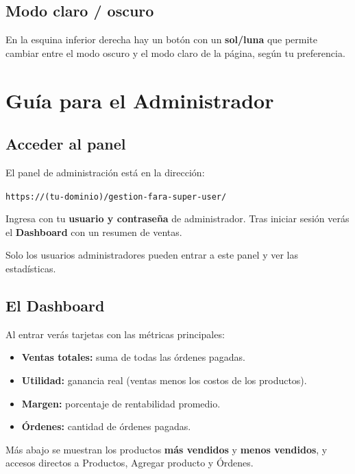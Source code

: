 \documentclass[11pt,a4paper]{article}
\begin{document}
\subsection{Modo claro / oscuro}

En la esquina inferior derecha hay un botón con un \textbf{sol/luna} que permite cambiar
entre el modo oscuro y el modo claro de la página, según tu preferencia.

\section{Guía para el Administrador}

\subsection{Acceder al panel}

El panel de administración está en la dirección:

\begin{center}
\texttt{https://(tu-dominio)/gestion-fara-super-user/}
\end{center}

Ingresa con tu \textbf{usuario y contraseña} de administrador. Tras iniciar sesión verás
el \textbf{Dashboard} con un resumen de ventas.

\begin{nota}
Solo los usuarios administradores pueden entrar a este panel y ver las estadísticas.
\end{nota}

\subsection{El Dashboard}

Al entrar verás tarjetas con las métricas principales:
\begin{itemize}[leftmargin=*]
  \item \textbf{Ventas totales:} suma de todas las órdenes pagadas.
  \item \textbf{Utilidad:} ganancia real (ventas menos los costos de los productos).
  \item \textbf{Margen:} porcentaje de rentabilidad promedio.
  \item \textbf{Órdenes:} cantidad de órdenes pagadas.
\end{itemize}
Más abajo se muestran los productos \textbf{más vendidos} y \textbf{menos vendidos},
y accesos directos a Productos, Agregar producto y Órdenes.
\end{document}

